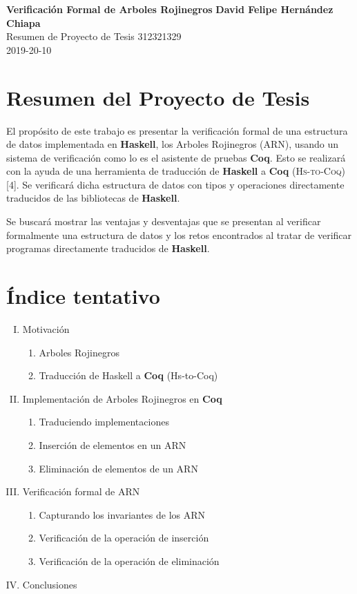 \documentclass[letterpaper, 11pt]{article}
\begin{document}
\noindent
\large
\textbf{Verificación Formal de Arboles Rojinegros} \hfill 
\textbf{David Felipe Hern\'andez Chiapa} \\
\normalsize Resumen de Proyecto de Tesis       \hfill 312321329\\
                                               \hfill 2019-20-10 \\
\newcommand{\coq}{\textbf{Coq}}

\section*{Resumen del Proyecto de Tesis}
El propósito de este trabajo es presentar la verificación formal de una 
estructura de datos implementada en \textbf{Haskell}, los Arboles Rojinegros 
(ARN), usando un sistema de verificación 
como lo es el asistente de pruebas \textbf{Coq}.
Esto se realizará con la ayuda de una herramienta de traducción de 
\textbf{Haskell} a \textbf{Coq} (\textsc{Hs-to-Coq}) [4]. 
Se verificar\'a dicha estructura de datos con tipos y operaciones
directamente traducidos de las bibliotecas de \textbf{Haskell}.

Se buscar\'a mostrar las ventajas y desventajas que se presentan al verificar 
formalmente una estructura de datos y los retos encontrados al tratar de 
verificar programas directamente traducidos de \textbf{Haskell}.

\section*{Índice tentativo}
\begin{enumerate}[I.]
  \item Motivación
    \begin{enumerate}[1.]
     \item Arboles Rojinegros
     \item Traducción de Haskell a {\coq} (Hs-to-Coq)
    \end{enumerate}

  \item Implementación de Arboles Rojinegros en {\coq}
    \begin{enumerate}[1.]
      \item Traduciendo implementaciones
      \item Inserción de elementos en un ARN
      \item Eliminación de elementos de un ARN
    \end{enumerate}

  \item Verificación formal de ARN
    \begin{enumerate}[1.]
      \item Capturando los invariantes de los ARN
      \item Verificaci\'on de la operaci\'on de inserci\'on 
      \item Verificaci\'on de la operaci\'on de eliminaci\'on
    \end{enumerate}
    
  \item Conclusiones
\end{enumerate}
\end{document}
